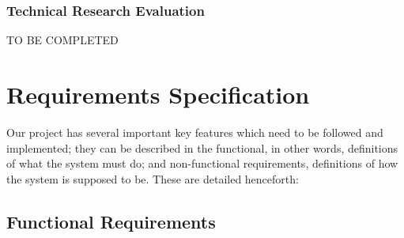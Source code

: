 \documentclass[10pt,a4paper]{article}
\begin{document}
\subsubsection{Technical Research Evaluation}
TO BE COMPLETED
\section{Requirements Specification}
Our project has several important key features which need to be followed and implemented; they can be described in the functional, in other words, definitions of what the system must do; and non-functional requirements, definitions of how the system is supposed to be. These are detailed henceforth:
\subsection{Functional Requirements}
\end{document}
